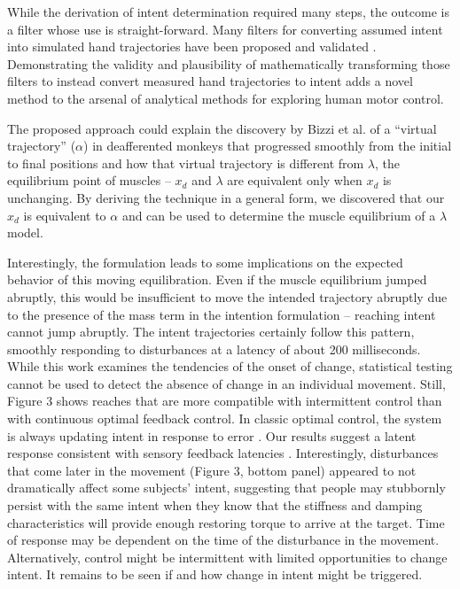 While the derivation of intent determination required many steps, the outcome is a filter whose use is straight-forward. Many filters for converting assumed intent into simulated hand trajectories have been proposed and validated \cite{shadmehr1994adaptive, franklin2003adaptation, burdet2006stability}. Demonstrating the validity and plausibility of mathematically transforming those filters to instead convert measured hand trajectories to intent adds a novel method to the arsenal of analytical methods for exploring human motor control.

The proposed approach could explain the discovery by Bizzi et al. \cite{bizzi1984posture} of a ``virtual trajectory'' ($\alpha$) in deafferented monkeys that progressed smoothly from the initial to final positions and how that virtual trajectory is different from $\lambda$, the equilibrium point of muscles -- $x_d$ and $\lambda$ are equivalent only when $x_d$ is unchanging.  By deriving the technique in a general form, we discovered that our $x_d$ is equivalent to $\alpha$ and can be used to determine the muscle equilibrium of a $\lambda$ model. 

Interestingly, the formulation leads to some implications on the expected behavior of this moving equilibration. Even if the muscle equilibrium jumped abruptly, this would be insufficient to move the intended trajectory abruptly due to the presence of the mass term in the intention formulation -- reaching intent cannot jump abruptly. The intent trajectories certainly follow this pattern, smoothly responding to disturbances at a latency of about 200 milliseconds. While this work examines the tendencies of the onset of change, statistical testing cannot be used to detect the absence of change in an individual movement. Still, Figure 3 shows reaches that are more compatible with intermittent control than with continuous optimal feedback control. In classic optimal control, the system is always updating intent in response to error \cite{todorov2002optimal}. Our results suggest a latent response consistent with sensory feedback latencies \cite{pruszynski2012optimal}. Interestingly, disturbances that come later in the movement (Figure 3, bottom panel) appeared to not dramatically affect some subjects' intent, suggesting that people may stubbornly persist with the same intent when they know that the stiffness and damping characteristics will provide enough restoring torque to arrive at the target. Time of response may be dependent on the time of the disturbance in the movement. Alternatively, control might be intermittent \cite{gawthrop2011intermittent} with limited opportunities to change intent. It remains to be seen if and how change in intent might be triggered. 


